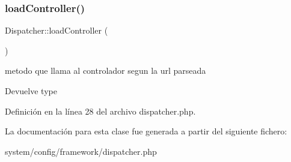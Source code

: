 \mbox{\label{class_dispatcher_a4881c5f9c9949c71632cd659fae77bc1}} 
\subsubsection{\texorpdfstring{loadController()}{loadController()}}
{\footnotesize\ttfamily Dispatcher\+::load\+Controller (\begin{DoxyParamCaption}{ }\end{DoxyParamCaption})}

metodo que llama al controlador segun la url parseada

\begin{DoxyReturn}{Devuelve}
type 
\end{DoxyReturn}


Definición en la línea 28 del archivo dispatcher.\+php.



La documentación para esta clase fue generada a partir del siguiente fichero\+:\begin{DoxyCompactItemize}
\item 
system/config/framework/dispatcher.\+php\end{DoxyCompactItemize}

